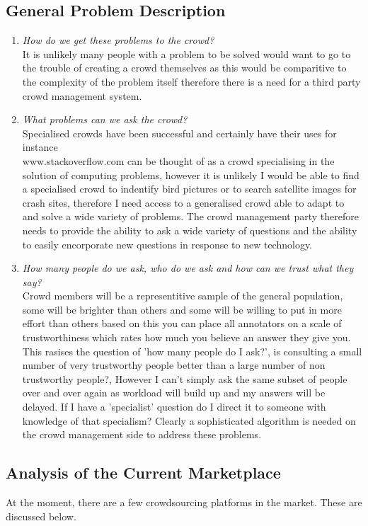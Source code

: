 \documentclass[11pt]{article}
\begin{document}
\subsection{General Problem Description}
\begin{enumerate}
\item
\emph{How do we get these problems to the crowd?} 
\\
It is unlikely many people with a problem to be solved would want to go to the trouble
of creating a crowd themselves as this would be comparitive to the complexity of the problem itself therefore there is a need for a third party
crowd management system. 
\item
\emph{What problems can we ask the crowd?} 
\\
Specialised crowds have been successful and certainly have their uses for instance\\
www.stackoverflow.com can be thought of as a crowd specialising in the solution of computing problems, however it is unlikely I would
be able to find a specialised crowd to indentify bird pictures or to search satellite images for crash sites, therefore I need access 
to a generalised crowd able to adapt to and solve a wide variety of problems. The crowd management party therefore needs to provide
the ability to ask a wide variety of questions and the ability to easily encorporate new questions in response to new technology.
\item
\emph{How many people do we ask, who do we ask and how can we trust what they say?} 
\\
Crowd members will be a representitive sample of the general 
population, some will be brighter than others and some will be willing to put in more effort than others based on this you can place all 
annotators on a scale of trustworthiness which rates how much you believe an answer they give you. This rasises the question of 'how many 
people do I ask?', is consulting a small number of very trustworthy people better than a large number of non trustworthy people?, However I 
can't simply ask the same subset of people over and over again as workload will build up and my answers will be delayed. If I have a 
'specialist' question do I direct it to someone with knowledge of that specialism? Clearly a sophisticated algorithm is needed on the crowd
management side to address these problems. 
\end{enumerate}


\subsection{Analysis of the Current Marketplace}
At the moment, there are a few crowdsourcing platforms in the market. These
are discussed below.
\end{document}
